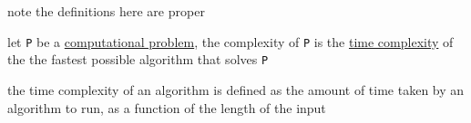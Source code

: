 \documentclass[a4paper,12pt]{article}
\newcommand{\?}{\stackrel{?}{=}}
\begin{document}
\newenvironment{note}
  {\begin{bclogo}[logo=\bcinfo, couleurBarre=orange, couleur=lightgray]{ note}}
  {\end{bclogo}}
\newenvironment{attention}
  {\begin{bclogo}[logo=\bcattention, couleurBarre=red, noborder=true, 
                couleur=red!15]{Important!}}
  {\end{bclogo}}

\begin{note}
the definitions here are proper\\[0pt]
\end{note}
\begin{definition}
let \texttt{P} be a \href{20221223133700-computational_problem.org}{computational problem}, the complexity of \texttt{P} is the \href{20221130014441-time_complexity.org}{time complexity} of the the fastest possible algorithm that solves \texttt{P}\\[0pt]
\end{definition}
\begin{definition}
the time complexity of an algorithm is defined as the amount of time taken by an algorithm to run, as a function of the length of the input\\[0pt]
\end{definition}
\end{document}
